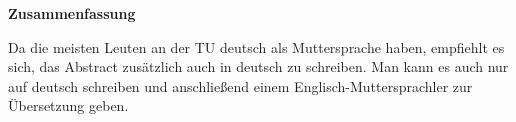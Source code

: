 \thispagestyle{empty}
\vspace*{0.2cm}

\begin{center}
    \textbf{Zusammenfassung}
\end{center}

\vspace*{0.2cm}

\noindent 
Da die meisten Leuten an der TU deutsch als Muttersprache haben, empfiehlt es sich, das Abstract zusätzlich auch in deutsch zu schreiben. Man kann es auch nur auf deutsch schreiben und anschließend einem Englisch-Muttersprachler zur Übersetzung geben.